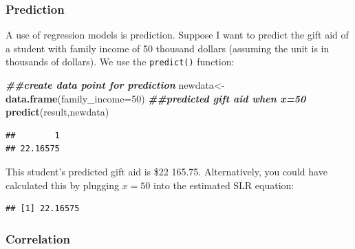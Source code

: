 \documentclass[
]{book}
\newenvironment{Shaded}{\begin{snugshade}}{\end{snugshade}}
\newcommand{\AttributeTok}[1]{\textcolor[rgb]{0.13,0.29,0.53}{#1}}
\newcommand{\DecValTok}[1]{\textcolor[rgb]{0.00,0.00,0.81}{#1}}
\newcommand{\DocumentationTok}[1]{\textcolor[rgb]{0.56,0.35,0.01}{\textbf{\textit{#1}}}}
\newcommand{\FunctionTok}[1]{\textcolor[rgb]{0.13,0.29,0.53}{\textbf{#1}}}
\newcommand{\NormalTok}[1]{#1}
\newcommand{\OtherTok}[1]{\textcolor[rgb]{0.56,0.35,0.01}{#1}}
\newcommand{\SpecialCharTok}[1]{\textcolor[rgb]{0.81,0.36,0.00}{\textbf{#1}}}
\begin{document}
\hypertarget{prediction}{%
\subsubsection*{Prediction}\label{prediction}}

A use of regression models is prediction. Suppose I want to predict the gift aid of a student with family income of 50 thousand dollars (assuming the unit is in thousands of dollars). We use the \texttt{predict()} function:

\begin{Shaded}
\begin{Highlighting}[]
\DocumentationTok{\#\#create data point for prediction}
\NormalTok{newdata}\OtherTok{\textless{}{-}}\FunctionTok{data.frame}\NormalTok{(}\AttributeTok{family\_income=}\DecValTok{50}\NormalTok{)}
\DocumentationTok{\#\#predicted gift aid when x=50}
\FunctionTok{predict}\NormalTok{(result,newdata)}
\end{Highlighting}
\end{Shaded}

\begin{verbatim}
##        1 
## 22.16575
\end{verbatim}

This student's predicted gift aid is \$22 165.75. Alternatively, you could have calculated this by plugging \(x=50\) into the estimated SLR equation:

\begin{Shaded}
\end{Shaded}

\begin{verbatim}
## [1] 22.16575
\end{verbatim}

\hypertarget{correlation-1}{%
\subsubsection*{Correlation}\label{correlation-1}}
\end{document}
